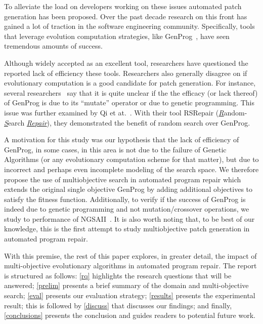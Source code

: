 \documentclass{sig-alternate}
\theoremstyle{break}
\newcommand{\tion}[1]{\textsection\ref{#1}}
\begin{document}
To alleviate the load on developers working on these issues automated patch generation has been proposed. Over the past decade research on this front has gained a lot of traction in the software engineering community. Specifically, tools that leverage evolution computation strategies, like GenProg~\cite{leGoues12}, have seen tremendous amounts of success. 

Although widely accepted as an excellent tool, researchers have questioned the reported lack of efficiency these tools. Researchers also generally disagree on if evolutionary computation is a good candidate for patch generation. For instance, several researchers~\cite{qi2014, kim2013, arcuri2011} say that it is quite unclear if the the efficacy (or lack thereof) of GenProg is due to its ``mutate'' operator or due to genetic programming. This issue was further examined by Qi et at.~\cite{qi2014}. With their tool RSRepair (\underline{\textit{R}}andom-\underline{\textit{S}}earch \underline{\textit{Repair}}), they demonstrated the benefit of random search over GenProg.

A motivation for this study was our hypothesis that the lack of efficiency of GenProg, in some cases, in this area is not due to the failure of Genetic Algorithms (or any evolutionary computation scheme for that matter), but due to incorrect and perhaps even incomplete modeling of the search space. We therefore propose the use of multiobjective search in automated program repair which extends the original single objective GenProg by adding additional objectives to satisfy the fitness function. Additionally, to verify if the success of GenProg is indeed due to genetic programming and not mutation/crossover operations, we study to performance of NGSAII~\cite{nsgaii}. It is also worth noting that, to be best of our knowledge, this is the first attempt to study multiobjective patch generation in automated program repair. 

With this premise, the rest of this paper explores, in greater detail, the impact of multi-objective evolutionary algorithms in automated program repair. The report is structured as follows: \tion{rq} highlights the research questions that will be answered; \tion{prelim} presents a brief summary of the domain and multi-objective search; \tion{eval}
presents our evaluation strategy; \tion{results} presents the experimental result; this is followed by \tion{discuss} that discusses our findings; and finally, \tion{conclusions} presents the conclusion and guides readers to potential future work.
 
\end{document}
